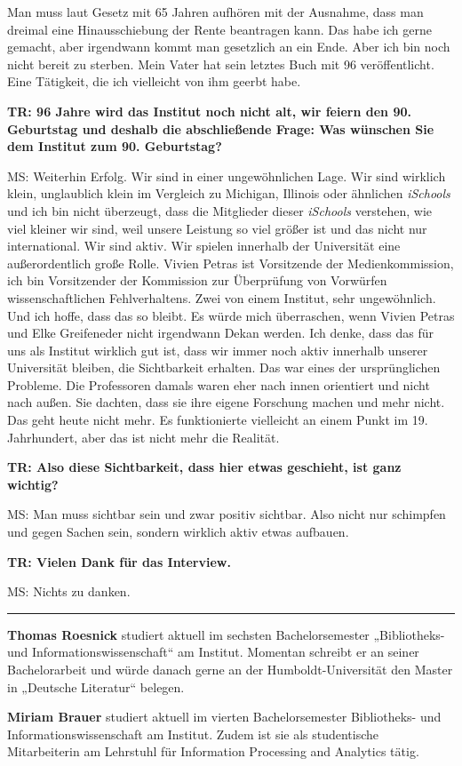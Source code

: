 \documentclass[a4paper,
fontsize=11pt,
oneside,
numbers=noperiodatend,
parskip=half-,
bibliography=totoc,
final
]{scrartcl}
\begin{document}
Man muss laut Gesetz mit 65 Jahren aufhören mit der Ausnahme, dass man
dreimal eine Hinausschiebung der Rente beantragen kann. Das habe ich
gerne gemacht, aber irgendwann kommt man gesetzlich an ein Ende. Aber
ich bin noch nicht bereit zu sterben. Mein Vater hat sein letztes Buch
mit 96 veröffentlicht. Eine Tätigkeit, die ich vielleicht von ihm geerbt
habe.

\textbf{TR: 96 Jahre wird das Institut noch nicht alt, wir feiern den
90. Geburtstag und deshalb die abschließende Frage: Was wünschen Sie dem
Institut zum 90. Geburtstag?}

MS: Weiterhin Erfolg. Wir sind in einer ungewöhnlichen Lage. Wir sind
wirklich klein, unglaublich klein im Vergleich zu Michigan, Illinois
oder ähnlichen \emph{iSchools} und ich bin nicht überzeugt, dass die
Mitglieder dieser \emph{iSchools} verstehen, wie viel kleiner wir sind,
weil unsere Leistung so viel größer ist und das nicht nur international.
Wir sind aktiv. Wir spielen innerhalb der Universität eine
außerordentlich große Rolle. Vivien Petras ist Vorsitzende der
Medienkommission, ich bin Vorsitzender der Kommission zur Überprüfung
von Vorwürfen wissenschaftlichen Fehlverhaltens. Zwei von einem
Institut, sehr ungewöhnlich. Und ich hoffe, dass das so bleibt. Es würde
mich überraschen, wenn Vivien Petras und Elke Greifeneder nicht
irgendwann Dekan werden. Ich denke, dass das für uns als Institut
wirklich gut ist, dass wir immer noch aktiv innerhalb unserer
Universität bleiben, die Sichtbarkeit erhalten. Das war eines der
ursprünglichen Probleme. Die Professoren damals waren eher nach innen
orientiert und nicht nach außen. Sie dachten, dass sie ihre eigene
Forschung machen und mehr nicht. Das geht heute nicht mehr. Es
funktionierte vielleicht an einem Punkt im 19. Jahrhundert, aber das ist
nicht mehr die Realität.

\textbf{TR: Also diese Sichtbarkeit, dass hier etwas geschieht, ist ganz
wichtig?}

MS: Man muss sichtbar sein und zwar positiv sichtbar. Also nicht nur
schimpfen und gegen Sachen sein, sondern wirklich aktiv etwas aufbauen.

\textbf{TR: Vielen Dank für das Interview.}

MS: Nichts zu danken.

\begin{center}\rule{0.5\linewidth}{\linethickness}\end{center}

\textbf{Thomas Roesnick} studiert aktuell im sechsten Bachelorsemester
„Bibliotheks- und Informationswissenschaft`` am Institut. Momentan
schreibt er an seiner Bachelorarbeit und würde danach gerne an der
Humboldt-Universität den Master in „Deutsche Literatur`` belegen.

\textbf{Miriam Brauer} studiert aktuell im vierten Bachelorsemester
Bibliotheks- und Informationswissenschaft am Institut. Zudem ist sie als
studentische Mitarbeiterin am Lehrstuhl für Information Processing and
Analytics tätig.
\end{document}
